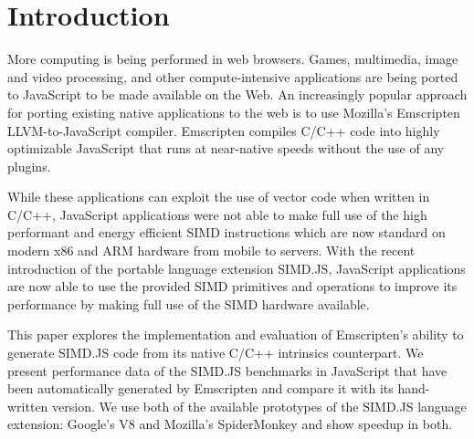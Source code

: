 
\section{Introduction}

More computing is being performed in web browsers. Games, multimedia, 
image and video processing, and other compute-intensive applications are 
being ported to JavaScript to be made available on the Web. An increasingly 
popular approach for porting existing native applications to the web is to use
Mozilla's Emscripten LLVM-to-JavaScript compiler. Emscripten compiles
C/C++ code into highly optimizable JavaScript that runs at near-native speeds
without the use of any plugins.

While these applications can exploit the use of vector code when written in C/C++, 
JavaScript applications were not able to make full use of the high performant and 
energy efficient SIMD instructions which are now standard on modern x86 and 
ARM hardware from mobile to servers. With the recent introduction of the portable 
language extension SIMD.JS, JavaScript applications are now able to use the 
provided SIMD primitives and operations to improve its performance by making full 
use of the SIMD hardware available.

This paper explores the implementation and evaluation of Emscripten's ability to generate 
SIMD.JS code from its native C/C++ intrinsics counterpart. We present performance 
data of the SIMD.JS benchmarks in JavaScript that have been automatically generated
by Emscripten and compare it with its hand-written version. We use both of the 
available prototypes of the SIMD.JS language extension: Google's V8 and Mozilla's 
SpiderMonkey and show speedup in both.

